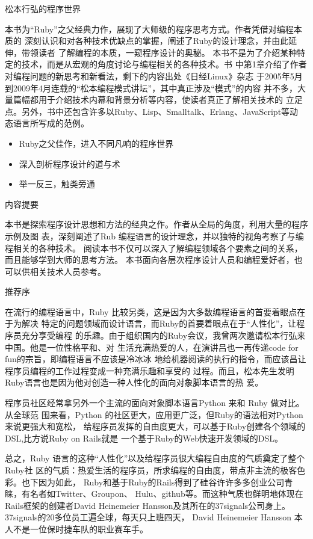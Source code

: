\documentclass[11pt]{ctexart}
\author{mac}
\date{\today}
\title{}
\begin{document}


\tableofcontents

\newpage
松本行弘的程序世界

本书为“Ruby”之父经典力作，展现了大师级的程序思考方式。作者凭借对编程本质的
深刻认识和对各种技术优缺点的掌握，阐述了Ruby的设计理念，并由此延伸，带领读者
了解编程的本质，一窥程序设计的奥秘。
本书不是为了介绍某种特定的技术，而是从宏观的角度讨论与编程相关的各种技术。书
中第1章介绍了作者对编程问题的新思考和新看法，剩下的内容出处《日经Linux》杂志
于2005年5月到2009年4月连载的“松本编程模式讲坛”，其中真正涉及“模式”的内容
并不多，大量篇幅都用于介绍技术内幕和背景分析等内容，使读者真正了解相关技术的
立足点。另外，书中还包含许多以Ruby、Lisp、Smalltalk、Erlang、JavaScript等动
态语言所写成的范例。

\begin{itemize}
\item Ruby之父佳作，进入不同凡响的程序世界
\item 深入剖析程序设计的道与术
\item 举一反三，触类旁通
\end{itemize}
\newpage
内容提要

本书是探索程序设计思想和方法的经典之作。作者从全局的角度，利用大量的程序示例及图
表，深刻阐述了Rub 编程语言的设计理念，并以独特的视角考察了与编程相关的各种技术。
阅读本书不仅可以深入了解编程领域各个要素之间的关系，而且能够学到大师的思考方法。
本书面向各层次程序设计人员和编程爱好者，也可以供相关技术人员参考。

\newpage

推荐序

在流行的编程语言中，Ruby 比较另类，这是因为大多数编程语言的首要着眼点在于为解决
特定的问题领域而设计语言，而Ruby的首要着眼点在于“人性化”，让程序员充分享受编程
的乐趣。由于组织国内的Ruby会议，我曾两次邀请松本行弘来中国。他是一位性格平和、对
生活充满热爱的人，在演讲吕也一再传递code for fun的宗旨，即编程语言不应该是冷冰冰
地给机器阅读的执行的指令，而应该昌让程序员编程的工作过程变成一种充满乐趣和享受的
过程。而且，松本先生发明Ruby语言也是因为他对创造一种人性化的面向对象脚本语言的热
爱。

程序员社区经常拿另外一个主流的面向对象脚本语言Python 来和 Ruby 做对比。从全球范
围来看，Python 的社区更大，应用更广泛，但Ruby的语法相对Python来说更强大和宽松，
给程序员发挥的自由度更大，可以基于Ruby创建各个领域的DSL,比方说Ruby on Rails就是
一个基于Ruby的Web快速开发领域的DSL。

总之，Ruby 语言的这种“人性化”以及给程序员很大编程自由度的气质奠定了整个Ruby社
区的气质：热爱生活的程序员，所求编程的自由度，带点非主流的极客色彩。也下因为如此，
Ruby和基于Ruby的Rails得到了硅谷许许多多创业公司青睐，有名者如Twitter、Groupon、
Hulu、github等。而这种气质也鲜明地体现在Rails框架的创建者David Heinemeier
Hansson及其所在的37signals公司身上。37signals的20多位员工遍全球，每天只上班四天，
David Heinemeier Hansson 本人不是一位保时捷车队的职业赛车手。
\end{document}
